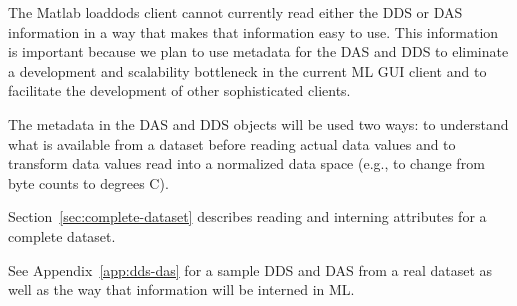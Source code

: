 \documentclass{article}
\begin{document}
The Matlab loaddods client cannot currently read either the DDS or DAS
information in a way that makes that information easy to use. This
information is important because we plan to use metadata for the DAS and DDS
to eliminate a development and scalability bottleneck in the current ML GUI
client and to facilitate the development of other sophisticated clients.

The metadata in the DAS and DDS objects will be used two ways: to understand
what is available from a dataset before reading actual data values and to
transform data values read into a normalized data space (e.g., to change
from byte counts to degrees C). 

Section~\ref{sec:complete-dataset} describes reading and interning
attributes for a complete dataset. 

See Appendix~\ref{app:dds-das} for a sample DDS and DAS from a real dataset
as well as the way that information will be interned in ML.
\end{document}
